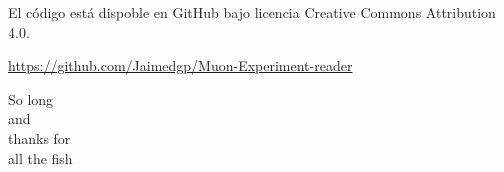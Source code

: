 \documentclass[xcolor=dvipsnames]{beamer}
\begin{document}
			\begin{frame}

				El código está dispoble en GitHub bajo licencia Creative Commons Attribution 4.0.

				\vspace{1cm}

				\url{https://github.com/Jaimedgp/Muon-Experiment-reader}
			\end{frame}

			\begin{frame}
				\centering
				\Huge

				So long \\ and \\ thanks for \\ all the fish

			\end{frame}

			
\end{document}
